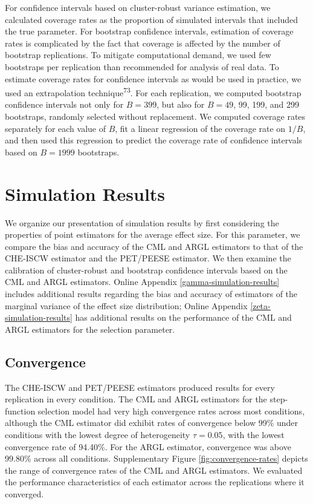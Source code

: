 \documentclass[
  american,
  man, donotrepeattitle,floatsintext]{apa7}
\begin{document}
For confidence intervals based on cluster-robust variance estimation, we calculated coverage rates as the proportion of simulated intervals that included the true parameter.
For bootstrap confidence intervals, estimation of coverage rates is complicated by the fact that coverage is affected by the number of bootstrap replications.
To mitigate computational demand, we used few bootstraps per replication than recommended for analysis of real data.
To estimate coverage rates for confidence intervals as would be used in practice, we used an extrapolation technique\textsuperscript{73}.
For each replication, we computed bootstrap confidence intervals not only for \(B = 399\), but also for \(B = 49\), 99, 199, and 299 bootstraps, randomly selected without replacement.
We computed coverage rates separately for each value of \(B\), fit a linear regression of the coverage rate on \(1 / B\), and then used this regression to predict the coverage rate of confidence intervals based on \(B = 1999\) bootstraps.

\section{Simulation Results}\label{simulation-results}

We organize our presentation of simulation results by first considering the properties of point estimators for the average effect size.
For this parameter, we compare the bias and accuracy of the CML and ARGL estimators to that of the CHE-ISCW estimator and the PET/PEESE estimator.
We then examine the calibration of cluster-robust and bootstrap confidence intervals based on the CML and ARGL estimators.
Online Appendix \ref{gamma-simulation-results} includes additional results regarding the bias and accuracy of estimators of the marginal variance of the effect size distribution; Online Appendix \ref{zeta-simulation-results} has additional results on the performance of the CML and ARGL estimators for the selection parameter.

\subsection{Convergence}\label{convergence}

The CHE-ISCW and PET/PEESE estimators produced results for every replication in every condition.
The CML and ARGL estimators for the step-function selection model had very high convergence rates across most conditions, although the CML estimator did exhibit rates of convergence below 99\% under conditions with the lowest degree of heterogeneity \(\tau = 0.05\), with the lowest convergence rate of 94.40\%.
For the ARGL estimator, convergence was above 99.80\% across all conditions.
Supplementary Figure \ref{fig:convergence-rates} depicts the range of convergence rates of the CML and ARGL estimators.
We evaluated the performance characteristics of each estimator across the replications where it converged.
\end{document}
